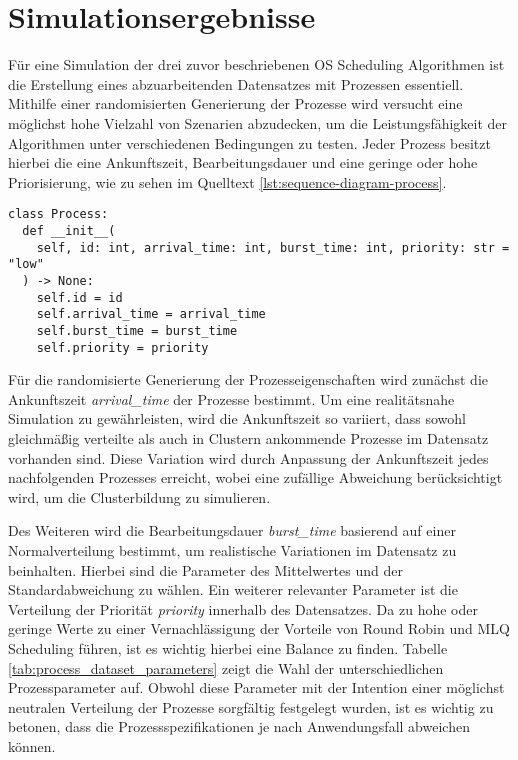 \section{Simulationsergebnisse}
Für eine Simulation der drei zuvor beschriebenen \ac{OS} Scheduling Algorithmen ist die Erstellung eines abzuarbeitenden Datensatzes mit Prozessen essentiell. Mithilfe einer randomisierten Generierung der Prozesse wird versucht eine möglichst hohe Vielzahl von Szenarien abzudecken, um die Leistungsfähigkeit der Algorithmen unter verschiedenen Bedingungen zu testen. Jeder Prozess besitzt hierbei die eine Ankunftszeit, Bearbeitungsdauer und eine geringe oder hohe Priorisierung, wie zu sehen im Quelltext \ref{lst:sequence-diagram-process}.

\begin{lstlisting}[caption={Prozess mit Attributen in Python implementiert}, label={lst:sequence-diagram-process}]
class Process:
  def __init__(
    self, id: int, arrival_time: int, burst_time: int, priority: str = "low"
  ) -> None:
	self.id = id
	self.arrival_time = arrival_time
	self.burst_time = burst_time
	self.priority = priority
\end{lstlisting}

Für die randomisierte Generierung der Prozesseigenschaften wird zunächst die Ankunftszeit \textit{arrival\_time} der Prozesse bestimmt. Um eine realitätsnahe Simulation zu gewährleisten, wird die Ankunftszeit so variiert, dass sowohl gleichmäßig verteilte als auch in Clustern ankommende Prozesse im Datensatz vorhanden sind. Diese Variation wird durch Anpassung der Ankunftszeit jedes nachfolgenden Prozesses erreicht, wobei eine zufällige Abweichung berücksichtigt wird, um die Clusterbildung zu simulieren.

Des Weiteren wird die Bearbeitungsdauer \textit{burst\_time} basierend auf einer Normalverteilung bestimmt, um realistische Variationen im Datensatz zu beinhalten. Hierbei sind die Parameter des Mittelwertes und der Standardabweichung zu wählen. Ein weiterer relevanter Parameter ist die Verteilung der Priorität \textit{priority} innerhalb des Datensatzes. Da zu hohe oder geringe Werte zu einer Vernachlässigung der Vorteile von Round Robin und \ac{MLQ} Scheduling führen, ist es wichtig hierbei eine Balance zu finden. Tabelle \ref{tab:process_dataset_parameters} zeigt die Wahl der unterschiedlichen Prozessparameter auf. Obwohl diese Parameter mit der Intention einer möglichst neutralen Verteilung der Prozesse sorgfältig festgelegt wurden, ist es wichtig zu betonen, dass die Prozessspezifikationen je nach Anwendungsfall abweichen können.

